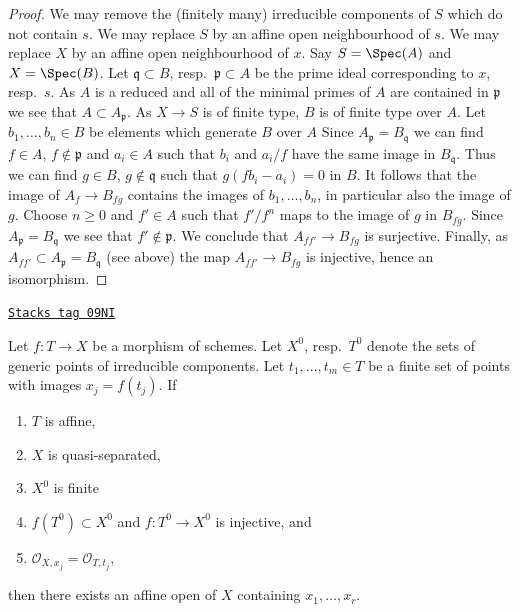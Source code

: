 \begin{proof}
We may remove the (finitely many) irreducible components of $S$
which do not contain $s$. We may replace $S$ by an affine open
neighbourhood of $s$. We may replace $X$ by an affine open neighbourhood
of $x$. Say $S = \Spec(A)$ and $X = \Spec(B)$. Let $\mathfrak q \subset B$,
resp.\ $\mathfrak p \subset A$ be the prime ideal corresponding to $x$,
resp.\ $s$. As $A$ is a reduced and all of the minimal primes of
$A$ are contained in $\mathfrak p$ we see that $A \subset A_\mathfrak p$.
As $X \to S$ is of finite type, $B$ is of finite type over $A$.
Let $b_1, \ldots, b_n \in B$ be elements which generate $B$ over $A$
Since $A_\mathfrak p = B_\mathfrak q$ we can find
$f \in A$, $f \not \in \mathfrak p$
and $a_i \in A$ such that $b_i$ and $a_i/f$ have the same image
in $B_\mathfrak q$. Thus we can find $g \in B$, $g \not \in \mathfrak q$
such that $g(fb_i - a_i) = 0$ in $B$. It follows that the image of
$A_f \to B_{fg}$ contains the images of $b_1, \ldots, b_n$, in
particular also the image of $g$.
Choose $n \geq 0$ and $f' \in A$ such that $f'/f^n$ maps
to the image of $g$ in $B_{fg}$. Since $A_\mathfrak p = B_\mathfrak q$
we see that $f' \not \in \mathfrak p$.
We conclude that $A_{ff'} \to B_{fg}$ is surjective.
Finally, as $A_{ff'} \subset A_\mathfrak p = B_\mathfrak q$ (see above)
the map $A_{ff'} \to B_{fg}$ is injective, hence an isomorphism.
\end{proof}

\begin{lemma}
\label{varieties-lemma-points-in-affine}
\href{https://stacks.math.columbia.edu/tag/09NI}{\texttt{Stacks tag 09NI}}

Let $f : T \to X$ be a morphism of schemes. Let $X^0$, resp.\ $T^0$
denote the sets of generic points of irreducible components.
Let $t_1, \ldots, t_m \in T$ be a finite set of points
with images $x_j = f(t_j)$. If
\begin{enumerate}
\item $T$ is affine,
\item $X$ is quasi-separated,
\item $X^0$ is finite
\item $f(T^0) \subset X^0$ and $f : T^0 \to X^0$ is injective, and
\item $\mathcal{O}_{X, x_j} = \mathcal{O}_{T, t_j}$,
\end{enumerate}
then there exists an affine open of $X$ containing $x_1, \ldots, x_r$.
\end{lemma}


